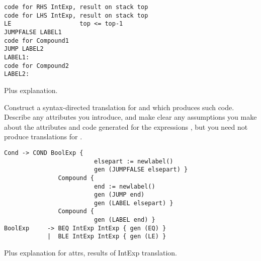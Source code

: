 \begin{questions}
\begin{subquestions}
\begin{subsubquestions}
\begin{modelanswer}
\begin{verbatim}
code for RHS IntExp, result on stack top
code for LHS IntExp, result on stack top
LE                   top <= top-1
JUMPFALSE LABEL1
code for Compound1
JUMP LABEL2
LABEL1:
code for Compound2
LABEL2:
\end{verbatim}
Plus explanation.
\end{modelanswer}

\subsubquestion
        Construct a syntax-directed translation for 
         and  which produces such code.
        Describe any attributes you
        introduce, and make clear any assumptions you make about 
        the attributes and code generated for the
        expressions , but you need not produce translations for
        .
\begin{modelanswer}
\begin{verbatim}
Cond -> COND BoolExp { 
                         elsepart := newlabel()
                         gen (JUMPFALSE elsepart) }
               Compound {
                         end := newlabel()
                         gen (JUMP end)
                         gen (LABEL elsepart) }
               Compound {
                         gen (LABEL end) }
BoolExp     -> BEQ IntExp IntExp { gen (EQ) }
            |  BLE IntExp IntExp { gen (LE) }
\end{verbatim}
Plus explanation for attrs, results of IntExp translation.
\end{modelanswer}
\end{subsubquestions}

\end{subquestions}

\question

\begin{subquestions}

\subquestion


\end{subquestions}
\end{questions}
